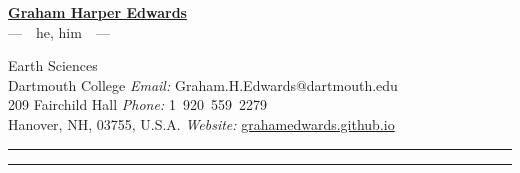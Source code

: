 \documentclass[10pt]{article}
\begin{document}
\begin{center}
\LARGE\textbf{\underline{Graham Harper Edwards}}\\ [.3em]
\large ---~~he, him~~---
\end{center}

Earth Sciences \\
Dartmouth College \hfill \textit{Email:} Graham.H.Edwards@dartmouth.edu \\
209 Fairchild Hall \hfill \textit{Phone:} 1~920~559~2279 \\
Hanover, NH, 03755, U.S.A.	\hfill \textit{Website:} \href{https://grahamedwards.github.io}{grahamedwards.github.io}

\vspace{1em}



















\vspace*{2em}



\begin{center}{\rule{2.5in}{0.5pt}}\end{center}  \begin{center}\vspace{-12pt} {\rule{2.5in}{0.5pt}}\end{center}



\end{document}
